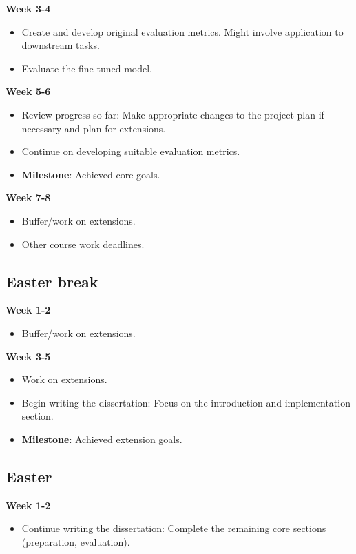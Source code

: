 \textbf{Week 3-4}
\begin{itemize}
    \item Create and develop original evaluation metrics. Might involve application to downstream tasks.
    \item Evaluate the fine-tuned model.
\end{itemize}

\textbf{Week 5-6}
\begin{itemize}
    \item Review progress so far: Make appropriate changes to the project plan if necessary and plan for extensions.
    \item Continue on developing suitable evaluation metrics.
    \item \textbf{Milestone}: Achieved core goals.
\end{itemize}

\textbf{Week 7-8}
\begin{itemize}
    \item Buffer/work on extensions.
    \item Other course work deadlines.
\end{itemize}

\subsection*{Easter break}
\textbf{Week 1-2}
\begin{itemize}
    \item Buffer/work on extensions.
\end{itemize}

\textbf{Week 3-5}
\begin{itemize}
    \item Work on extensions.
    \item Begin writing the dissertation: Focus on the introduction and implementation section.
    \item \textbf{Milestone}: Achieved extension goals.
\end{itemize}

\subsection*{Easter}
\textbf{Week 1-2}
\begin{itemize}
    \item Continue writing the dissertation: Complete the remaining core sections (preparation, evaluation).
\end{itemize}

